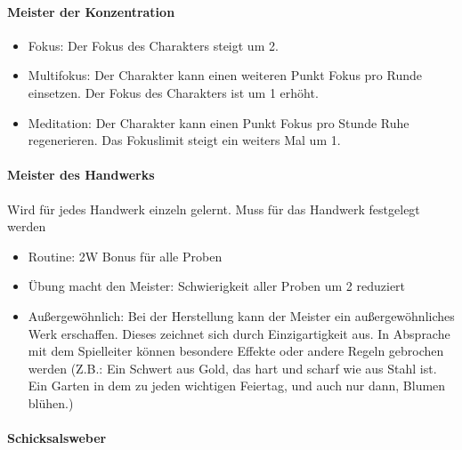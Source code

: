 \documentclass{article}
\begin{document}
\paragraph{Meister der Konzentration}

\begin{itemize}
\item Fokus: Der Fokus des Charakters steigt um 2.
\item Multifokus: Der Charakter kann einen weiteren Punkt Fokus pro Runde einsetzen. Der Fokus des Charakters ist um 1 erhöht.
\item Meditation: Der Charakter kann einen Punkt Fokus pro Stunde Ruhe regenerieren. Das Fokuslimit steigt ein weiters Mal um 1.
\end{itemize}

\paragraph{Meister des Handwerks}

Wird für jedes Handwerk einzeln gelernt. Muss für das Handwerk festgelegt werden

\begin{itemize}
\item Routine: 2W Bonus für alle Proben
\item Übung macht den Meister: Schwierigkeit aller Proben um 2 reduziert
\item Außergewöhnlich: Bei der Herstellung kann der Meister ein außergewöhnliches Werk erschaffen. Dieses zeichnet sich durch Einzigartigkeit aus. In Absprache mit dem Spielleiter können besondere Effekte oder andere Regeln gebrochen werden (Z.B.: Ein Schwert aus Gold, das hart und scharf wie aus Stahl ist. Ein Garten in dem zu jeden wichtigen Feiertag, und auch nur dann, Blumen blühen.)
\end{itemize}

\paragraph{Schicksalsweber}
\end{document}
